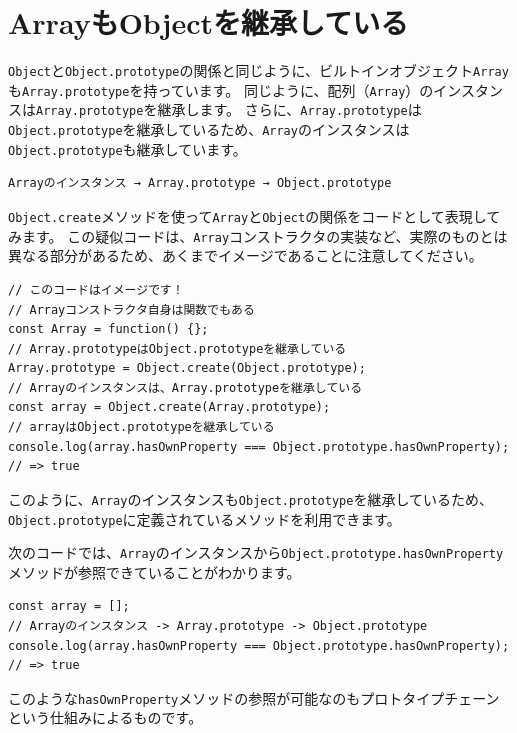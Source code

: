 \hypertarget{inherit-object}{%
\section{ArrayもObjectを継承している}\label{inherit-object}}

\texttt{Object}と\texttt{Object.prototype}の関係と同じように、ビルトインオブジェクト\texttt{Array}も\texttt{Array.prototype}を持っています。
同じように、配列（\texttt{Array}）のインスタンスは\texttt{Array.prototype}を継承します。
さらに、\texttt{Array.prototype}は\texttt{Object.prototype}を継承しているため、\texttt{Array}のインスタンスは\texttt{Object.prototype}も継承しています。

\begin{lstlisting}
Arrayのインスタンス → Array.prototype → Object.prototype
\end{lstlisting}

\texttt{Object.create}メソッドを使って\texttt{Array}と\texttt{Object}の関係をコードとして表現してみます。
この疑似コードは、\texttt{Array}コンストラクタの実装など、実際のものとは異なる部分があるため、あくまでイメージであることに注意してください。

\begin{lstlisting}
// このコードはイメージです！
// Arrayコンストラクタ自身は関数でもある
const Array = function() {};
// Array.prototypeはObject.prototypeを継承している
Array.prototype = Object.create(Object.prototype);
// Arrayのインスタンスは、Array.prototypeを継承している
const array = Object.create(Array.prototype);
// arrayはObject.prototypeを継承している
console.log(array.hasOwnProperty === Object.prototype.hasOwnProperty); 
// => true
\end{lstlisting}

このように、\texttt{Array}のインスタンスも\texttt{Object.prototype}を継承しているため、
\texttt{Object.prototype}に定義されているメソッドを利用できます。

次のコードでは、\texttt{Array}のインスタンスから\texttt{Object.prototype.hasOwnProperty}メソッドが参照できていることがわかります。

\begin{lstlisting}
const array = [];
// Arrayのインスタンス -> Array.prototype -> Object.prototype
console.log(array.hasOwnProperty === Object.prototype.hasOwnProperty); 
// => true
\end{lstlisting}

\enlargethispage{\baselineskip}このような\texttt{hasOwnProperty}メソッドの参照が可能なのもプロトタイプチェーンという仕組みによるものです。

